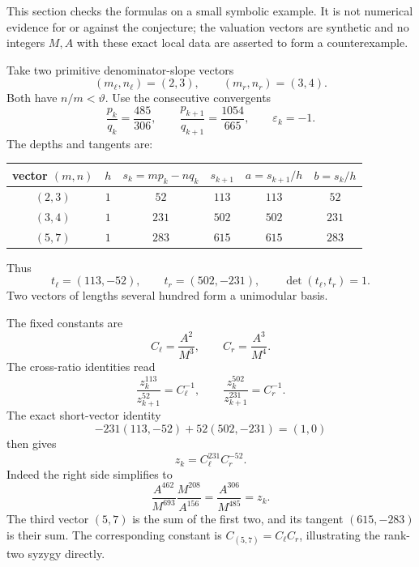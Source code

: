 \documentclass[11pt,oneside]{article}
\theoremstyle{definition}
\theoremstyle{remark}
\newcommand{\thetaq}{\vartheta}
\newcommand{\eps}{\varepsilon}
\begin{document}
This section checks the formulas on a small symbolic example.  It is not numerical evidence
for or against the conjecture; the valuation vectors are synthetic and no integers $M,A$
with these exact local data are asserted to form a counterexample.

Take two primitive denominator-slope vectors
\begin{equation}
 (m_\ell,n_\ell)=(2,3),
 \qquad
 (m_r,n_r)=(3,4).
 \label{eq:sample-vectors}
\end{equation}
Both have $n/m<\thetaq$.  Use the consecutive convergents
\begin{equation}
 \frac{p_k}{q_k}=\frac{485}{306},
 \qquad
 \frac{p_{k+1}}{q_{k+1}}=\frac{1054}{665},
 \qquad \eps_k=-1.
 \label{eq:sample-convergents}
\end{equation}
The depths and tangents are:

\begin{center}
\begin{tabular}{@{}cccccc@{}}
\toprule
vector $(m,n)$ & $h$ & $s_k=mp_k-nq_k$ & $s_{k+1}$ & $a=s_{k+1}/h$ & $b=s_k/h$\\
\midrule
$(2,3)$ & $1$ & $52$ & $113$ & $113$ & $52$\\
$(3,4)$ & $1$ & $231$ & $502$ & $502$ & $231$\\
$(5,7)$ & $1$ & $283$ & $615$ & $615$ & $283$\\
\bottomrule
\end{tabular}
\end{center}

Thus
\begin{equation}
 t_\ell=(113,-52),
 \qquad t_r=(502,-231),
 \qquad \det(t_\ell,t_r)=1.
 \label{eq:sample-tangents}
\end{equation}
Two vectors of lengths several hundred form a unimodular basis.

The fixed constants are
\begin{equation}
 C_\ell=\frac{A^2}{M^3},
 \qquad C_r=\frac{A^3}{M^4}.
 \label{eq:sample-C}
\end{equation}
The cross-ratio identities read
\begin{equation}
 \frac{z_k^{113}}{z_{k+1}^{52}}=C_\ell^{-1},
 \qquad
 \frac{z_k^{502}}{z_{k+1}^{231}}=C_r^{-1}.
 \label{eq:sample-cross}
\end{equation}
The exact short-vector identity
\begin{equation}
 -231(113,-52)+52(502,-231)=(1,0)
 \label{eq:sample-bezout}
\end{equation}
then gives
\begin{equation}
 z_k=C_\ell^{231}C_r^{-52}.
 \label{eq:sample-z}
\end{equation}
Indeed the right side simplifies to
\[
 \frac{A^{462}}{M^{693}}\frac{M^{208}}{A^{156}}
 =\frac{A^{306}}{M^{485}}=z_k.
\]
The third vector $(5,7)$ is the sum of the first two, and its tangent
$(615,-283)$ is their sum.  The corresponding constant is
$C_{(5,7)}=C_\ell C_r$, illustrating the rank-two syzygy directly.
\end{document}
